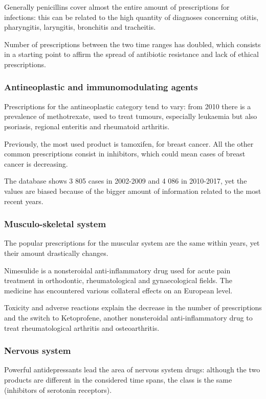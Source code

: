 Generally penicillins cover almost the entire amount of prescriptions for infections: this can be related to the high quantity of diagnoses concerning otitis, pharyngitis, laryngitis, bronchitis and tracheitis. 

Number of prescriptions between the two time ranges has doubled, which consists in a starting point to affirm the spread of antibiotic resistance and lack of ethical prescriptions.

\subsubsection{Antineoplastic and immunomodulating agents}
Prescriptions for the antineoplastic category tend to vary: from 2010 there is a prevalence of methotrexate, used to treat tumours, especially leukaemia but also psoriasis, regional enteritis and rheumatoid arthritis.

Previously, the most used product is tamoxifen, for breast cancer. All the other common prescriptions consist in inhibitors, which could mean cases of breast cancer is decreasing.

The database shows 3 805 cases in 2002-2009 and 4 086 in 2010-2017, yet the values are biased because of the bigger amount of information related to the most recent years.

\subsubsection{Musculo-skeletal system}
The popular prescriptions for the muscular system are the same within years, yet their amount drastically changes.

Nimesulide is a nonsteroidal anti-inflammatory drug used for acute pain treatment in orthodontic, rheumatological and gynaecological fields. The medicine has encountered various collateral effects on an European level.

Toxicity and adverse reactions explain the decrease in the number of prescriptions and the switch to Ketoprofene, another nonsteroidal anti-inflammatory drug to treat rheumatological arthritis and osteoarthritis.

\subsubsection{Nervous system}
Powerful antidepressants lead the area of nervous system drugs: although the two products are different in the considered time spans, the class is the same (inhibitors of serotonin receptors).

